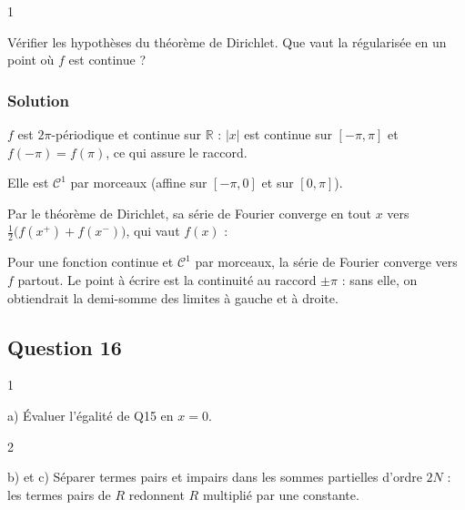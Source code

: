 \documentclass[11pt,a4paper]{article}
\newcommand{\equationajustee}[1]{%
  \sbox{\boiteequation}{$\displaystyle #1$}%
  \ifdim\wd\boiteequation>\linewidth
    \[\resizebox{\linewidth}{!}{\usebox{\boiteequation}}\]%
  \else
    \[#1\]%
  \fi}
\begin{document}
\begin{indication}{1}

Vérifier les hypothèses du théorème de Dirichlet. Que vaut la régularisée en un point où \(f\) est continue ?

\end{indication}

\hypertarget{solution-14}{%
\subsubsection{Solution}\label{solution-14}}

\(f\) est \(2\pi\)-périodique et continue sur \(\mathbb R\) : \(|x|\) est continue sur \([-\pi,\pi]\) et \(f(-\pi)=f(\pi)\), ce qui assure le raccord.

Elle est \(\mathcal C^1\) par morceaux (affine sur \([-\pi,0]\) et sur \([0,\pi]\)).

Par le théorème de Dirichlet, sa série de Fourier converge en tout \(x\) vers \(\frac12\big(f(x^+)+f(x^-)\big)\), qui vaut \(f(x)\) :
\equationajustee{\boxed{\forall x\in\mathbb R,\ f(x)=\frac\pi2-\frac4\pi\sum_{p=0}^{+\infty}\frac{\cos\big((2p+1)x\big)}{(2p+1)^2}}.}

\begin{methode}

Pour une fonction continue et \(\mathcal C^1\) par morceaux, la série de Fourier converge vers \(f\) partout. Le point à écrire est la continuité au raccord \(\pm\pi\) : sans elle, on obtiendrait la demi-somme des limites à gauche et à droite.

\end{methode}

\hypertarget{question-16}{%
\subsection{Question 16}\label{question-16}}

\begin{indication}{1}

a) Évaluer l'égalité de Q15 en \(x=0\).

\end{indication}

\begin{indication}{2}

b) et c) Séparer termes pairs et impairs dans les sommes partielles d'ordre \(2N\) : les termes pairs de \(R\) redonnent \(R\) multiplié par une constante.

\end{indication}
\end{document}
